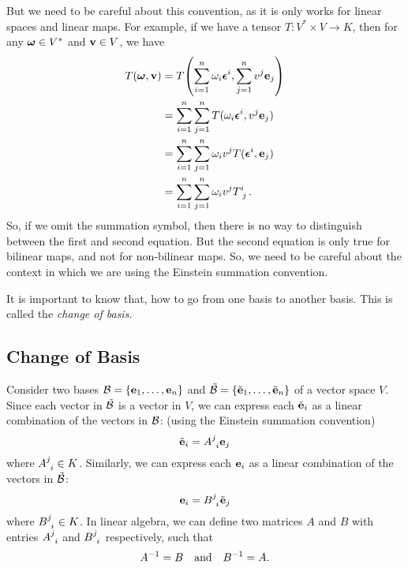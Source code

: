 \begin{remark}[Caution]
    But we need to be careful about this convention, as it is only works for linear spaces and linear maps. For example, if we have a tensor \(T: V^* \times V \to K\), then for any \(\vb*{\omega} \in V^*\) and \(\vb{v} \in V\), we have
    \begin{align*}
        T(\vb*{\omega}, \vb{v}) & = T\qty(\sum_{i = 1}^{n} \omega_i \vb*{\epsilon}^i, \sum_{j = 1}^{n} v^j \vb{e}_j) \\
                                & = \sum_{i = 1}^{n} \sum_{j = 1}^{n} T(\omega_i \vb*{\epsilon}^i, v^j \vb{e}_j)     \\
                                & = \sum_{i = 1}^{n} \sum_{j = 1}^{n} \omega_i v^j T(\vb*{\epsilon}^i, \vb{e}_j)     \\
                                & = \sum_{i = 1}^{n} \sum_{j = 1}^{n} \omega_i v^j \tensor{T}{^{i}_{j}}.
    \end{align*}
    So, if we omit the summation symbol, then there is no way to distinguish between the first and second equation. But the second equation is only true for bilinear maps, and not for non-bilinear maps. So, we need to be careful about the context in which we are using the Einstein summation convention.
\end{remark}
It is important to know that, how to go from one basis to another basis. This is called the \emph{change of basis}.

\subsection{Change of Basis}

Consider two bases \(\mathcal B = \qty{\vb{e}_1, \ldots, \vb{e}_n}\) and \(\tilde{\mathcal B} = \qty{\tilde{\vb{e}}_1, \ldots, \tilde{\vb{e}}_n}\) of a vector space \(V\). Since each vector in \(\tilde{\mathcal B}\) is a vector in \(V\), we can express each \(\tilde{\vb{e}}_i\) as a linear combination of the vectors in \(\mathcal B\): (using the Einstein summation convention)
\begin{equation}
    \tilde{\vb{e}}_i = \tensor{A}{^j_i} \vb{e}_j
\end{equation}
where \(\tensor{A}{^j_i} \in K\). Similarly, we can express each \(\vb{e}_i\) as a linear combination of the vectors in \(\tilde{\mathcal B}\):
\begin{equation}
    \vb{e}_i = \tensor{B}{^j_i} \tilde{\vb{e}}_j
\end{equation}
where \(\tensor{B}{^j_i} \in K\). In linear algebra, we can define two matrices \(A\) and \(B\) with entries \(\tensor{A}{^j_i}\) and \(\tensor{B}{^j_i}\) respectively, such that
\begin{equation}
    A^{-1} = B \quad \text{and} \quad B^{-1} = A.
\end{equation}

